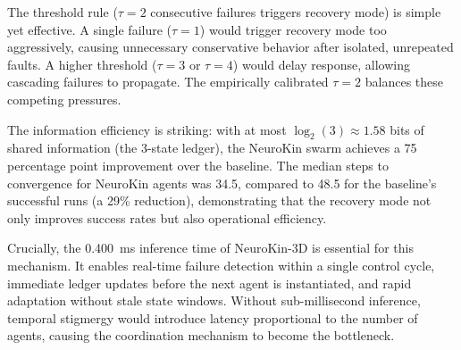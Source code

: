 \documentclass[12pt,a4paper,oneside]{report}
\begin{document}
The threshold rule ($\tau = 2$ consecutive failures triggers recovery mode) is simple yet effective. A single failure ($\tau = 1$) would trigger recovery mode too aggressively, causing unnecessary conservative behavior after isolated, unrepeated faults. A higher threshold ($\tau = 3$ or $\tau = 4$) would delay response, allowing cascading failures to propagate. The empirically calibrated $\tau = 2$ balances these competing pressures.

The information efficiency is striking: with at most $\log_2(3) \approx 1.58$ bits of shared information (the 3-state ledger), the NeuroKin swarm achieves a 75 percentage point improvement over the baseline. The median steps to convergence for NeuroKin agents was 34.5, compared to 48.5 for the baseline's successful runs (a 29\% reduction), demonstrating that the recovery mode not only improves success rates but also operational efficiency.

Crucially, the 0.400~ms inference time of NeuroKin-3D is essential for this mechanism. It enables real-time failure detection within a single control cycle, immediate ledger updates before the next agent is instantiated, and rapid adaptation without stale state windows. Without sub-millisecond inference, temporal stigmergy would introduce latency proportional to the number of agents, causing the coordination mechanism to become the bottleneck.
\end{document}
